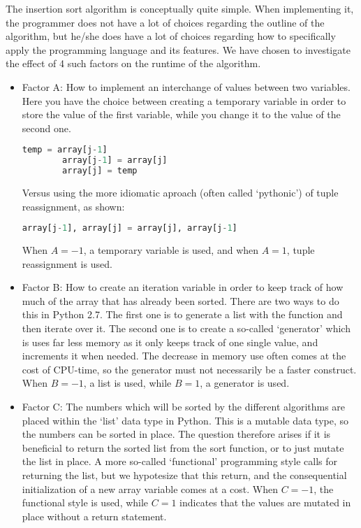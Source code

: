 The insertion sort algorithm is conceptually quite simple. When implementing it, the programmer does not have a lot of choices regarding the outline of the algorithm, but he/she does have a lot of choices regarding how to specifically apply the programming language and its features. We have chosen to investigate the effect of 4 such factors on the runtime of the algorithm.    

\begin{itemize}
    \item Factor A: How to implement an interchange of values between two variables. Here you have the choice between creating a temporary variable in order to store the value of the first variable, while you change it to the value of the second one.
    \begin{lstlisting}[language=Python]
        temp = array[j-1]
        array[j-1] = array[j]
        array[j] = temp
    \end{lstlisting}
    Versus using the more idiomatic aproach (often called `pythonic') of tuple reassignment, as shown:
    \begin{lstlisting}[language=Python]
        array[j-1], array[j] = array[j], array[j-1]
    \end{lstlisting}
    When $A=-1$, a temporary variable is used, and when $A=1$, tuple reassignment is used.
 
    \item Factor B: How to create an iteration variable in order to keep track of how much of the array that has already been sorted. There are two ways to do this in Python 2.7. The first one is to generate a list with the  function and then iterate over it. The second one is to create a so-called `generator' which is uses far less memory as it only keeps track of one single value, and increments it when needed. The decrease in memory use often comes at the cost of CPU-time, so the generator must not necessarily be a faster construct. When $B=-1$, a list is used, while $B=1$, a generator is used.
    
    \item Factor C: The numbers which will be sorted by the different algorithms are placed within the `list' data type in Python. This is a mutable data type, so the numbers can be sorted in place. The question therefore arises if it is beneficial to return the sorted list from the sort function, or to just mutate the list in place. A more so-called `functional' programming style calls for returning the list, but we hypotesize that this return, and the consequential initialization of a new array variable comes at a cost. When $C=-1$, the functional style is used, while $C=1$ indicates that the values are mutated in place without a return statement.
    

\end{itemize}
